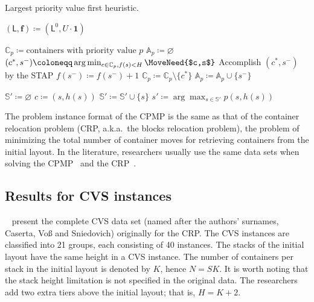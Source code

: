 \documentclass[review,3p,times,12pt,number]{elsarticle}\usepackage{amsmath}\usepackage{amssymb}
\renewcommand{\citet}[1]{\citeauthor{#1}~\citep{#1}}
\renewcommand{\gets}{\coloneqq}
\newcommand{\setalgo}{\linespread{1}\fontsize{10}{12}\selectfont}
\begin{document}
\begin{algorithm*}[htbp]
\caption{Largest priority value first heuristic.}
\label{algo:lpvfh}


\setalgo

\begin{multicols}{2}

\Begin
{
  $(\mathsf{L},\boldsymbol{f})\gets (\mathsf{L}^0,U\cdot\boldsymbol{1})$\;

  {
    $\mathbb{C}_p\gets\textrm{containers with priority value $p$}$\;
    $\mathbb{A}_p\gets\varnothing$
    {
      $(c^*, s^-)\gets \arg\min_{c\in\mathbb{C}_p, f(s)<H} \MoveNeed{$c,s$}$\;
      Accomplish $( c^*, s^-)$ by the STAP\;
      $f(s^-)\gets f(s^-)+1$\;
      $\mathbb{C}_p\gets\mathbb{C}_p\setminus\{c^*\}$\;
      $\mathbb{A}_p\gets \mathbb{A}_p\cup \{s^-\}$\;
    }
    {
    	\;
    }
  }
}



{
  {
    $\mathbb{S}'\gets\varnothing$\;
    {
      $c\gets (s,h(s))$\;
      {
        $\mathbb{S}'\gets \mathbb{S}'\cup \{s\}$\;
      }
    }
    {
      $s'\gets \arg\max_{s\in\mathbb{S}'} p(s,h(s))$\;
      \;
    }
    {
      \Break\;
    }
  }
}
\end{multicols}
\BlankLine
\BlankLine
\end{algorithm*}





The problem instance format of the CPMP is the same as that of the {container relocation problem} (CRP, a.k.a.\ the blocks relocation problem), the problem of minimizing the total number of container moves for retrieving containers from the initial layout.
In the literature, researchers usually use the same data sets when solving the CPMP~\citep{bort2012,cas2009,exp2012,wang2015} and the CRP~\citep{cas2011,exp2014,forster2012,jin2013,jin2015}.

\subsection{Results for CVS instances}

\citet{cas2011} present the complete CVS data set (named after the authors' surnames, Caserta, Vo{\ss} and Sniedovich) originally for the CRP\@. The CVS instances are classified into 21 groups, each consisting of 40 instances. The stacks of the initial layout have the same height in a CVS instance. The number of containers per stack in the initial layout is denoted by $K$, hence $N=SK$. It is worth noting that the stack height limitation is not specified in the original data. The researchers add two extra tiers above the initial layout; that is, $H=K+2$.
\end{document}
